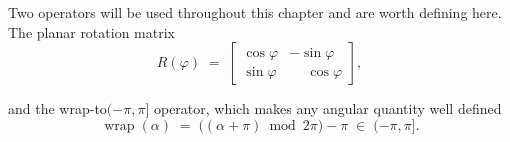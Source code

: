 \documentclass[final_report.tex]{subfiles}
\begin{document}
\label{ch:ropart}

Two operators will be used throughout this chapter and are worth defining here. The planar rotation matrix
\begin{equation}\label{eq:rotmat}
  R(\varphi) \;=\;
  \begin{bmatrix} \cos\varphi & -\sin\varphi \\ \sin\varphi & \phantom{-}\cos\varphi \end{bmatrix},
\end{equation}

and the wrap-to$(-\pi,\pi]$ operator, which makes any angular quantity well defined
\begin{equation}\label{eq:wrap}
  \operatorname{wrap}(\alpha) \;=\; \bigl((\alpha + \pi) \bmod 2\pi\bigr) - \pi
  \;\in\; (-\pi, \pi].
\end{equation}
\end{document}
